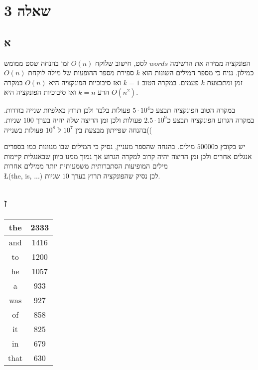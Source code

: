 \documentclass{article}
\begin{document}
\section{שאלה 3}
\subsection{א}

הפונקציה ממירה את הרשימה $words$ לסט, חישוב שלוקח $O(n)$ זמן בהנחה שסט ממומש כמילון. נניח כי מספר המילים השונות הוא $k$ ספירת מספר ההופעות של מילה לוקחת $O(n)$ זמן ומתבצעת $k$ פעמים. במקרה הטוב $k = 1$ ואז סיבוכיות הפונקציה היא $O(n)$ במקרה הרע $k = n$ ואז סיבוכיות הפונקציה היא $O(n^2)$.

במקרה הטוב הפונקציה תבצע כ$5 \cdot 10^4$ פעולות בלבד ולכן תרוץ באלפיות שנייה בודדות.
במקרה הגרוע הפונקציה תבצע כ$2.5 \cdot 10^9$ פעולות ולכן זמן הריצה שלה יהיה בערך $100$ שניות.
)בהנחה שפייתון מבצעת בין $10^7$ ל $10^8$ פעולות בשנייה(

יש בקובץ כ$50000$ מילים. בהנחה שהספר מעניין, נסיק כי המילים שבו מגוונות כמו בספרים אנגלים אחרים ולכן זמן הריצה יהיה קרוב למקרה הגרוע אך נמוך ממנו כיוון שבאנגלית קיימות מילים המופיעות הסתברותית משמעותית יותר ממילים אחרות \\
\L{(the, is, ...)}
 לכן נסיק שהפונקציה תרוץ בערך $10$ שניות.
 
\subsection{ז}

\begin{center}
\begin{tabular}{|c|c|}
\hline
the & 2333 \\
\hline
and & 1416 \\
\hline
to & 1200 \\
\hline
he & 1057 \\
\hline
a & 933 \\
\hline
was & 927 \\
\hline
of & 858 \\
\hline
it & 825 \\
\hline
in & 679 \\
\hline
that & 630 \\
\hline
\end{tabular}
\end{center}
\end{document}
